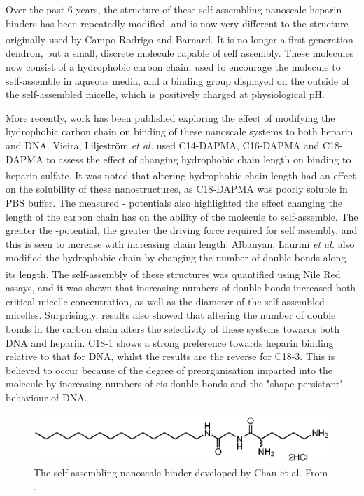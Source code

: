 Over the past 6 years, the structure of these self-assembling nanoscale heparin binders has been repeatedly modified, and is now very different to the structure originally used by Campo-Rodrigo and Barnard.\textsuperscript{\cite{Rodrigo2011Self-AssemblingBinding}} It is no longer a first generation dendron, but a small, discrete molecule capable of self assembly. These molecules now consist of a hydrophobic carbon chain, used to encourage the molecule to self-assemble in aqueous media, and a binding group displayed on the outside of the self-assembled micelle, which is positively charged at physiological pH. 

More recently, work has been published exploring the effect of modifying the hydrophobic carbon chain on binding of these nanoscale systems to both heparin and DNA. Vieira, Liljestr\"om \textit{et al.} used C14-DAPMA, C16-DAPMA and C18-DAPMA to assess the effect of changing hydrophobic chain length on binding to heparin sulfate.\textsuperscript{\cite{Vieira2017EmergenceHeparin}}  It was noted that altering hydrophobic chain length had an effect on the solubility of these nanostructures, as C18-DAPMA was poorly soluble in PBS buffer.  The measured \textzeta - potentials also highlighted the effect changing the length of the carbon chain has on the ability of the molecule to self-assemble. The greater the \textzeta-potential, the greater the driving force required for self assembly, and this is seen to increase with increasing chain length.  Albanyan, Laurini \textit{et al.} also modified the hydrophobic chain by changing the number of double bonds along its length.\textsuperscript{\cite{Albanyan2017Self-AssembledLigands}} The self-assembly of these structures was quantified using Nile Red assays, and it was shown that increasing numbers of double bonds increased both critical micelle concentration, as well as the diameter of the self-assembled micelles. Surprisingly, results also showed that altering the number of double bonds in the carbon chain alters the selectivity of these systems towards both DNA and heparin. C18-1 shows a strong preference towards heparin binding relative to that for DNA, whilst the results are the reverse for C18-3. This is believed to occur because of the degree of preorganisation imparted into the molecule by increasing numbers of cis double bonds and the "shape-persistant" behaviour of DNA. 

\begin{figure} [ht!]
\centering
\includegraphics{Figures/C16-Gly-Lys.eps}
\caption{The self-assembling nanoscale binder developed by Chan et al. From \cite{Chan2016ChiralBinding}.}
\label{C16-Gly-Lys}
\end{figure}

